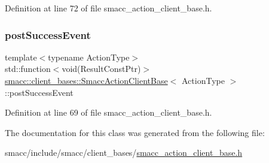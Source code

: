 Definition at line 72 of file smacc\+\_\+action\+\_\+client\+\_\+base.\+h.

\mbox{\label{classsmacc_1_1client__bases_1_1SmaccActionClientBase_afb4f82508cd653d496392f321e84a783}} 
\subsubsection{\texorpdfstring{post\+Success\+Event}{postSuccessEvent}}
{\footnotesize\ttfamily template$<$typename Action\+Type$>$ \\
std\+::function$<$void(Result\+Const\+Ptr)$>$ \hyperlink{classsmacc_1_1client__bases_1_1SmaccActionClientBase}{smacc\+::client\+\_\+bases\+::\+Smacc\+Action\+Client\+Base}$<$ Action\+Type $>$\+::post\+Success\+Event}



Definition at line 69 of file smacc\+\_\+action\+\_\+client\+\_\+base.\+h.



The documentation for this class was generated from the following file\+:\begin{DoxyCompactItemize}
\item 
smacc/include/smacc/client\+\_\+bases/\hyperlink{smacc__action__client__base_8h}{smacc\+\_\+action\+\_\+client\+\_\+base.\+h}\end{DoxyCompactItemize}
